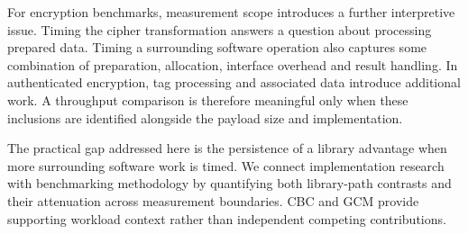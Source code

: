 For encryption benchmarks, measurement scope introduces a further interpretive issue. Timing the cipher transformation answers a question about processing prepared data. Timing a surrounding software operation also captures some combination of preparation, allocation, interface overhead and result handling. In authenticated encryption, tag processing and associated data introduce additional work. A throughput comparison is therefore meaningful only when these inclusions are identified alongside the payload size and implementation.

The practical gap addressed here is the persistence of a library advantage when more surrounding software work is timed. We connect implementation research with benchmarking methodology by quantifying both library-path contrasts and their attenuation across measurement boundaries. CBC and GCM provide supporting workload context rather than independent competing contributions.

